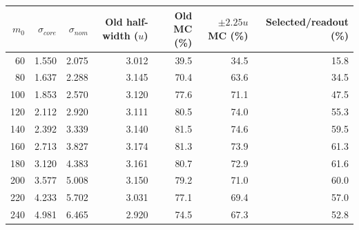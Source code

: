 \begin{tabular}{rrrrrrr}
\toprule
$m_0$ & $\sigma_{core}$ & $\sigma_{nom}$ & Old half-width ($u$) & Old MC (\%) & $\pm2.25u$ MC (\%) & Selected/readout (\%) \\
\midrule
60 & 1.550 & 2.075 & 3.012 & 39.5 & 34.5 & 15.8 \\
80 & 1.637 & 2.288 & 3.145 & 70.4 & 63.6 & 34.5 \\
100 & 1.853 & 2.570 & 3.120 & 77.6 & 71.1 & 47.5 \\
120 & 2.112 & 2.920 & 3.111 & 80.5 & 74.0 & 55.3 \\
140 & 2.392 & 3.339 & 3.140 & 81.5 & 74.6 & 59.5 \\
160 & 2.713 & 3.827 & 3.174 & 81.3 & 73.9 & 61.3 \\
180 & 3.120 & 4.383 & 3.161 & 80.7 & 72.9 & 61.6 \\
200 & 3.577 & 5.008 & 3.150 & 79.2 & 71.0 & 60.0 \\
220 & 4.233 & 5.702 & 3.031 & 77.1 & 69.4 & 57.0 \\
240 & 4.981 & 6.465 & 2.920 & 74.5 & 67.3 & 52.8 \\
\bottomrule
\end{tabular}
